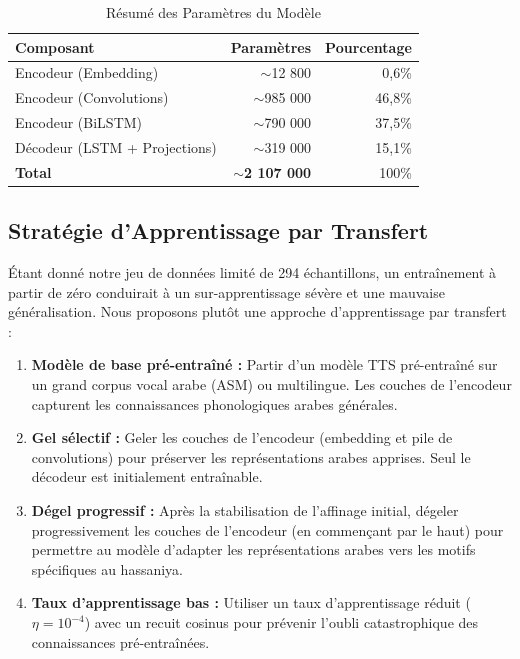 \documentclass[12pt,a4paper]{article}
\begin{document}
\begin{table}[H]
\centering
\caption{Résumé des Paramètres du Modèle}
\label{tab:model_params}
\begin{tabular}{lrr}
\toprule
\textbf{Composant} & \textbf{Paramètres} & \textbf{Pourcentage} \\
\midrule
Encodeur (Embedding) & $\sim$12 800 & 0,6\% \\
Encodeur (Convolutions) & $\sim$985 000 & 46,8\% \\
Encodeur (BiLSTM) & $\sim$790 000 & 37,5\% \\
Décodeur (LSTM + Projections) & $\sim$319 000 & 15,1\% \\
\midrule
\textbf{Total} & $\sim$\textbf{2 107 000} & 100\% \\
\bottomrule
\end{tabular}
\end{table}

\subsection{Stratégie d'Apprentissage par Transfert}

Étant donné notre jeu de données limité de 294 échantillons, un entraînement à partir de zéro conduirait à un sur-apprentissage sévère et une mauvaise généralisation. Nous proposons plutôt une approche d'apprentissage par transfert :

\begin{enumerate}
    \item \textbf{Modèle de base pré-entraîné :} Partir d'un modèle TTS pré-entraîné sur un grand corpus vocal arabe (ASM) ou multilingue. Les couches de l'encodeur capturent les connaissances phonologiques arabes générales.

    \item \textbf{Gel sélectif :} Geler les couches de l'encodeur (embedding et pile de convolutions) pour préserver les représentations arabes apprises. Seul le décodeur est initialement entraînable.

    \item \textbf{Dégel progressif :} Après la stabilisation de l'affinage initial, dégeler progressivement les couches de l'encodeur (en commençant par le haut) pour permettre au modèle d'adapter les représentations arabes vers les motifs spécifiques au hassaniya.

    \item \textbf{Taux d'apprentissage bas :} Utiliser un taux d'apprentissage réduit ($\eta = 10^{-4}$) avec un recuit cosinus pour prévenir l'oubli catastrophique des connaissances pré-entraînées.
\end{enumerate}
\end{document}
